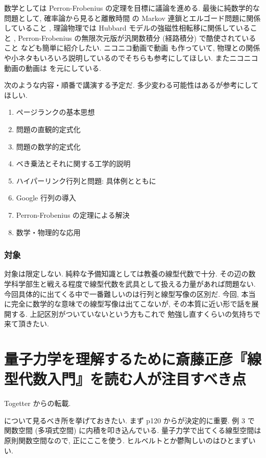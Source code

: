 \documentclass[openany, a4paper, oneside]{jsbook}
\begin{document}
数学としては Perron-Frobenius の定理を目標に議論を進める.
最後に純数学的な問題として,
確率論から見ると離散時間 の Markov 連鎖とエルゴード問題に関係していること \cite[7 節]{TadahisaFunaki1},
理論物理では Hubbard モデルの強磁性相転移に関係していること \cite{HalTasaki5},
Perron-Frobenius の無限次元版が汎関数積分 (経路積分) で酷使されていること \cite{LorincziHiroshimaBetz1} なども簡単に紹介したい.
ニコニコ動画で動画 \cite{phasetr1} も作っていて,
物理との関係や小ネタもいろいろ説明しているのでそちらも参考にしてほしい.
またニコニコ動画の動画は \cite{DavidAustin1} を元にしている.

次のような内容・順番で講演する予定だ.
多少変わる可能性はあるが参考にしてほしい.
\begin{enumerate}
\item ページランクの基本思想
\item 問題の直観的定式化
\item 問題の数学的定式化
\item ベき乗法とそれに関する工学的説明
\item ハイパーリンク行列と問題: 具体例とともに
\item Google 行列の導入
\item Perron-Frobenius の定理による解決
\item 数学・物理的な応用
\end{enumerate}
\subsection{対象}

対象は限定しない.
純粋な予備知識としては教養の線型代数で十分.
その辺の数学科学部生と戦える程度で線型代数を武具として扱える力量があれば問題ない.
今回具体的に出てくる中で一番難しいのは行列と線型写像の区別だ.
今回, 本当に完全に数学的な意味での線型写像は出てこないが,
その本質に近い形で話を展開する.
上記区別がついていないという方もこれで 勉強し直すくらいの気持ちで来て頂きたい.
\chapter{量子力学を理解するために斎藤正彦『線型代数入門』\cite{MasahikoSaitoh1}を読む人が注目すべき点}

Togetter からの転載.

\cite{MasahikoSaitoh1} について見るべき所を挙げておきたい.
まず p120 からが決定的に重要.
例 3 で関数空間 (多項式空間) に内積を叩き込んでいる.
量子力学で出てくる線型空間は原則関数空間なので, 正にここを使う.
ヒルベルトとか鬱陶しいのはひとまずいい.
\end{document}
